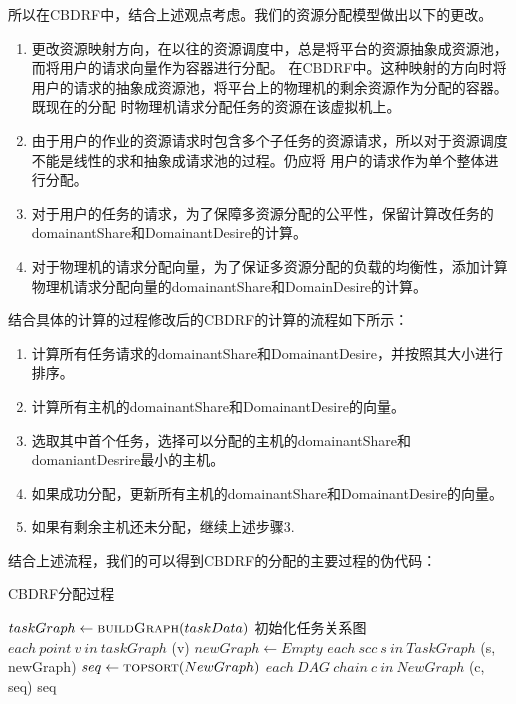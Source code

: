所以在CBDRF中，结合上述观点考虑。我们的资源分配模型做出以下的更改。
\begin{enumerate}
\item	更改资源映射方向，在以往的资源调度中，总是将平台的资源抽象成资源池，而将用户的请求向量作为容器进行分配。
在CBDRF中。这种映射的方向时将用户的请求的抽象成资源池，将平台上的物理机的剩余资源作为分配的容器。既现在的分配
时物理机请求分配任务的资源在该虚拟机上。
\item	由于用户的作业的资源请求时包含多个子任务的资源请求，所以对于资源调度不能是线性的求和抽象成请求池的过程。仍应将
用户的请求作为单个整体进行分配。
\item 对于用户的任务的请求，为了保障多资源分配的公平性，保留计算改任务的domainantShare和DomainantDesire的计算。
\item 对于物理机的请求分配向量，为了保证多资源分配的负载的均衡性，添加计算物理机请求分配向量的domainantShare和DomainDesire的计算。
\end{enumerate}

结合具体的计算的过程修改后的CBDRF的计算的流程如下所示：
\begin{enumerate}
\item 计算所有任务请求的domainantShare和DomainantDesire，并按照其大小进行排序。	

\item	计算所有主机的domainantShare和DomainantDesire的向量。
\item 选取其中首个任务，选择可以分配的主机的domainantShare和domaniantDesrire最小的主机。
\item 如果成功分配，更新所有主机的domainantShare和DomainantDesire的向量。
\item 如果有剩余主机还未分配，继续上述步骤3.
\end{enumerate}

结合上述流程，我们的可以得到CBDRF的分配的主要过程的伪代码：
\begin{algorithm} 
\caption {CBDRF分配过程} 
\begin{codebox}
\li	$taskGraph \leftarrow \textnormal{\scshape buildGraph}(taskData)$ \RComment 初始化任务关系图
\li	\For $each \ point \ v \ in \ taskGraph$    
\li	\Do	
		(v)				
	\End
\li	$newGraph \leftarrow Empty$
\li	\For $each \ scc \ s \ in \ TaskGraph$
\li	\Do
		(s, newGraph)
	\End
\li	$seq \leftarrow \textnormal{\scshape topsort}(NewGraph)$
\li	\For $each \ DAG \ chain \ c \ in \ NewGraph$
\li	\Do	
		(c, seq)
	\End 
\li	\Return seq
\end{codebox}
\end{algorithm} 
